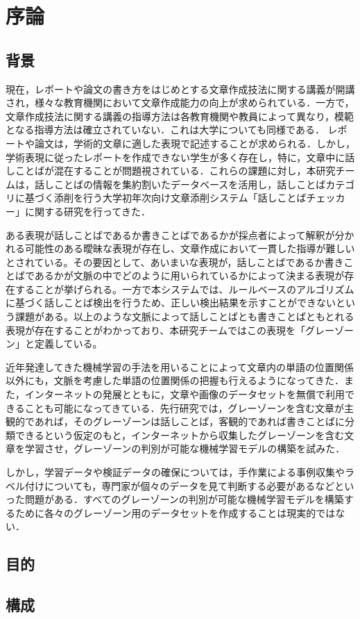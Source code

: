 \chapter{序論\label{c1}}

\section{背景}
現在，レポートや論文の書き方をはじめとする文章作成技法に関する講義が開講され，様々な教育機関において文章作成能力の向上が求められている．一方で，文章作成技法に関する講義の指導方法は各教育機関や教員によって異なり，模範となる指導方法は確立されていない．これは大学についても同様である．
レポートや論文は，学術的文章に適した表現で記述することが求められる．しかし，学術表現に従ったレポートを作成できない学生が多く存在し，特に，文章中に話しことばが混在することが問題視されている．これらの課題に対し，本研究チームは，話しことばの情報を集約割いたデータベースを活用し，話しことばカテゴリに基づく添削を行う大学初年次向け文章添削システム「話しことばチェッカー」に関する研究を行ってきた．

ある表現が話しことばであるか書きことばであるかが採点者によって解釈が分かれる可能性のある曖昧な表現が存在し、文章作成において一貫した指導が難しいとされている。その要因として、あいまいな表現が，話しことばであるか書きことばであるかが文脈の中でどのように用いられているかによって決まる表現が存在することが挙げられる。一方で本システムでは、ルールベースのアルゴリズムに基づく話しことば検出を行うため、正しい検出結果を示すことができないという課題がある。以上のような文脈によって話しことばとも書きことばともとれる表現が存在することがわかっており、本研究チームではこの表現を「グレーゾーン」と定義している。

近年発達してきた機械学習の手法を用いることによって文章内の単語の位置関係以外にも，文脈を考慮した単語の位置関係の把握も行えるようになってきた．また，インターネットの発展とともに，文章や画像のデータセットを無償で利用できることも可能になってきている．先行研究では，グレーゾーンを含む文章が主観的であれば，そのグレーゾーンは話しことば，客観的であれば書きことばに分類できるという仮定のもと，インターネットから収集したグレーゾーンを含む文章を学習させ，グレーゾーンの判別が可能な機械学習モデルの構築を試みた．

しかし，学習データや検証データの確保については，手作業による事例収集やラベル付けについても，専門家が個々のデータを見て判断する必要があるなどといった問題がある．すべてのグレーゾーンの判別が可能な機械学習モデルを構築するために各々のグレーゾーン用のデータセットを作成することは現実的ではない．

\section{目的}


\section{構成}

